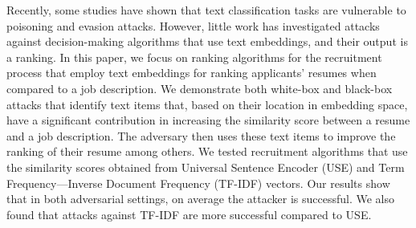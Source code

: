 Recently, some studies have shown that text classification tasks are vulnerable to poisoning and evasion attacks. However, little work has investigated attacks against decision-making algorithms that use text embeddings, and their output is a ranking. In this paper, we focus on ranking algorithms for the recruitment process that employ text embeddings for ranking applicants' resumes when compared to a job description. We demonstrate both white-box and black-box attacks that identify text items that, based on their location in embedding space, have a significant contribution in increasing the similarity score between a resume and a job description. The adversary then uses these text items to improve the ranking of their resume among others. We tested recruitment algorithms that use the similarity scores obtained from Universal Sentence Encoder (USE) and Term Frequency---Inverse Document Frequency (TF-IDF) vectors.  Our results show that in both adversarial settings, on average the attacker is successful.  We also found that attacks against TF-IDF are more successful compared to USE.
